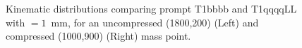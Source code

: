 \begin{figure}[h!]
\begin{center}
     \\
     ~
    \caption{Kinematic distributions comparing prompt T1bbbb and T1qqqqLL with \ctau$=1$~mm, for an
        uncompressed (1800,200) (Left) and compressed (1000,900) (Right) mass point.}
    \label{fig:T1qqqqLLvsT1bbbb}
  \end{center}
\end{figure}

%
%
%

